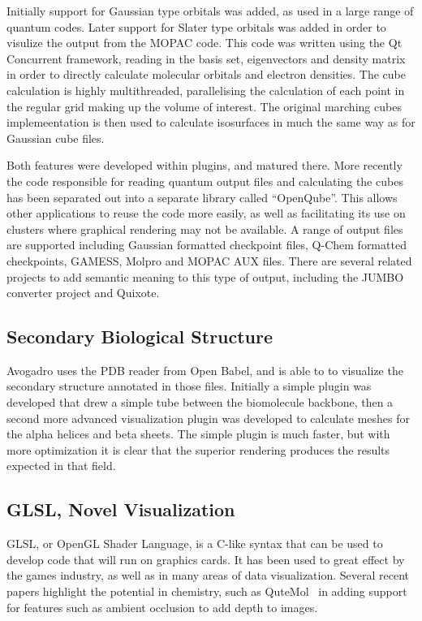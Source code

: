 \documentclass[10pt]{bmc_article}
\newenvironment{bmcformat}{\begin{raggedright}
\baselineskip20pt\sloppy\setboolean{publ}{false}}{\end{raggedright}
\baselineskip20pt\sloppy}
\begin{document}
\begin{bmcformat}
Initially support for Gaussian type orbitals was added, as used in a large
range of quantum codes. Later support for Slater type orbitals was added in
order to visulize the output from the MOPAC code. This code was written using
the Qt Concurrent framework, reading in the basis set, eigenvectors and density
matrix in order to directly calculate molecular orbitals and electron
densities. The cube calculation is highly multithreaded, parallelising the
calculation of each point in the regular grid making up the volume of interest.
The original marching cubes implemeentation is then used to calculate
isosurfaces in much the same way as for Gaussian cube files.

Both features were developed within plugins, and matured there. More recently
the code responsible for reading quantum output files and calculating the cubes
has been separated out into a separate library called ``OpenQube''. This allows
other applications to reuse the code more easily, as well as facilitating its
use on clusters where graphical rendering may not be available. A range of
output files are supported including Gaussian formatted checkpoint files,
Q-Chem formatted checkpoints, GAMESS, Molpro and MOPAC AUX files. There are
several related projects to add semantic meaning to this type of output,
including the JUMBO converter project and Quixote.

\subsection{Secondary Biological Structure}

Avogadro uses the PDB reader from Open Babel, and is able to to visualize the
secondary structure annotated in those files. Initially a simple plugin was
developed that drew a simple tube between the biomolecule backbone, then a
second more advanced visualization plugin was developed to calculate meshes for
the alpha helices and beta sheets. The simple plugin is much faster, but with
more optimization it is clear that the superior rendering produces the results
expected in that field.

\subsection{GLSL, Novel Visualization}

GLSL, or OpenGL Shader Language, is a C-like syntax that can be used to develop
code that will run on graphics cards. It has been used to great effect by the
games industry, as well as in many areas of data visualization. Several recent
papers highlight the potential in chemistry, such as QuteMol~\cite{QuteMol} in
adding support for features such as ambient occlusion to add depth to images.


\end{bmcformat}
\end{document}
